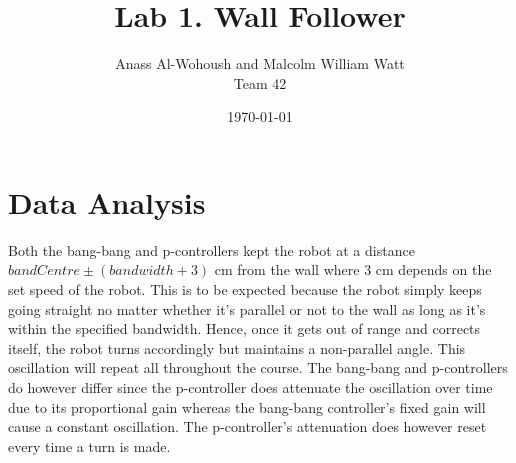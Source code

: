 \documentclass[letterpaper,12pt]{article}
\begin{document}
\title{Lab 1. Wall Follower}
\date{\today}
\author{Anass Al-Wohoush and Malcolm William Watt \\ Team 42}
\maketitle

\section{Data Analysis}{Both the bang-bang and p-controllers kept the robot at a distance $bandCentre \pm (bandwidth + 3)$ cm from the wall where 3 cm depends on the set speed of the robot. This is to be expected because the robot simply keeps going straight no matter whether it’s parallel or not to the wall as long as it’s within the specified bandwidth. Hence, once it gets out of range and corrects itself, the robot turns accordingly but maintains a non-parallel angle. This oscillation will repeat all throughout the course. The bang-bang and p-controllers do however differ since the p-controller does attenuate the oscillation over time due to its proportional gain whereas the bang-bang controller’s fixed gain will cause a constant oscillation. The p-controller’s attenuation does however reset every time a turn is made.}
\end{document}
